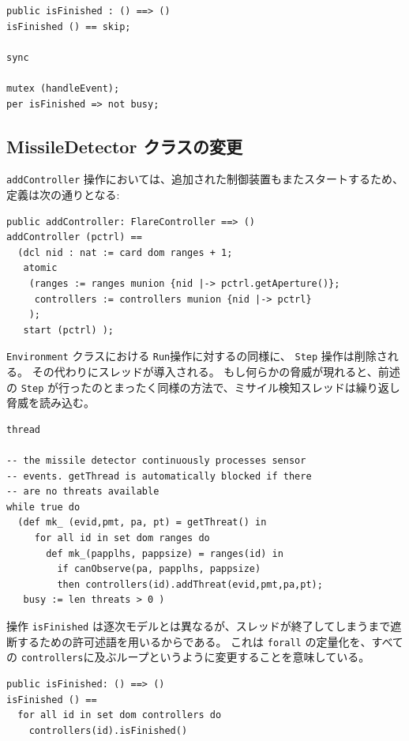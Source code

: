 \documentclass[\pformat,12pt]{jreport}
\begin{document}
\begin{lstlisting}
public isFinished : () ==> ()
isFinished () == skip;

sync

mutex (handleEvent);
per isFinished => not busy;
\end{lstlisting}

\subsection{MissileDetector クラスの変更}

 \texttt{addController} 操作においては、追加された制御装置もまたスタートするため、定義は次の通りとなる:

\begin{lstlisting}
public addController: FlareController ==> ()
addController (pctrl) ==
  (dcl nid : nat := card dom ranges + 1;
   atomic
    (ranges := ranges munion {nid |-> pctrl.getAperture()};
     controllers := controllers munion {nid |-> pctrl}
    );
   start (pctrl) );
\end{lstlisting}

 \texttt{Environment} クラスにおける \texttt{Run}操作に対するの同様に、 \texttt{Step} 操作は削除される。
その代わりにスレッドが導入される。
もし何らかの脅威が現れると、前述の \texttt{Step} が行ったのとまったく同様の方法で、ミサイル検知スレッドは繰り返し脅威を読み込む。

\begin{lstlisting} 
thread

-- the missile detector continuously processes sensor
-- events. getThread is automatically blocked if there
-- are no threats available
while true do
  (def mk_ (evid,pmt, pa, pt) = getThreat() in
     for all id in set dom ranges do
       def mk_(papplhs, pappsize) = ranges(id) in
         if canObserve(pa, papplhs, pappsize)
         then controllers(id).addThreat(evid,pmt,pa,pt);
   busy := len threats > 0 )
\end{lstlisting}

操作 \texttt{isFinished} は逐次モデルとは異なるが、スレッドが終了してしまうまで遮断するための許可述語を用いるからである。
これは \texttt{forall} の定量化を、すべての \texttt{controllers}に及ぶループというように変更することを意味している。

\begin{lstlisting}
public isFinished: () ==> ()
isFinished () ==
  for all id in set dom controllers do
    controllers(id).isFinished()
\end{lstlisting}
\end{document}
